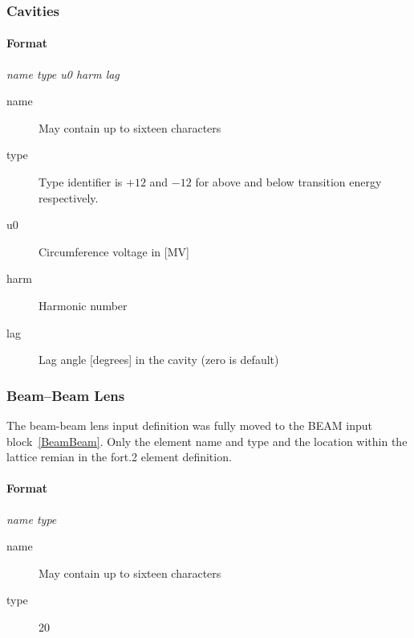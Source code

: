 \documentclass[a4paper,11pt]{report}
\begin{document}
\subsubsection{Cavities} \label{Cavities}
\paragraph{Format} {\em name type u0 harm lag}
\begin{description}
\item [name] May contain up to sixteen characters
\item [type] Type identifier is $+12$ and $-12$ for above and below
  transition energy respectively.
\item [u0] Circumference voltage in [MV]
\item [harm] Harmonic number
\item [lag] Lag angle [degrees] in the cavity (zero is default)
\end{description}

\subsubsection{Beam--Beam Lens} \label{BBS}
The beam-beam lens input definition was fully moved to the BEAM input block~\ref{BeamBeam}. Only the element name and type and the location within
the lattice remian in the fort.2 element definition.
\paragraph{Format} {\em name type}
\begin{description}
\item [name] May contain up to sixteen characters
\item [type] 20

\end{description}
\end{document}
